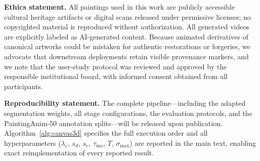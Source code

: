 \smallskip
\noindent\textbf{Ethics statement.}
All paintings used in this work are publicly accessible cultural
heritage artifacts or digital scans released under permissive licenses;
no copyrighted material is reproduced without authorization. All
generated videos are explicitly labeled as AI-generated content.
Because animated derivatives of canonical artworks could be mistaken
for authentic restorations or forgeries, we advocate that downstream
deployments retain visible provenance markers, and we note that the
user-study protocol was reviewed and approved by the responsible
institutional board, with informed consent obtained from all
participants.

\smallskip
\noindent\textbf{Reproducibility statement.}
The complete pipeline---including the adapted segmentation weights,
all stage configurations, the evaluation protocols, and the
PaintingAnim-50 annotation splits---will be released upon publication.
Algorithm~\ref{alg:canvas3d} specifies the full execution order and
all hyperparameters ($\lambda_c$, $s_d$, $s_e$, $\tau_{\mathrm{mo}}$,
$T$, $\sigma_{\max}$) are reported in the main text, enabling exact
reimplementation of every reported result.
